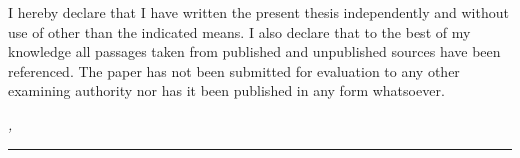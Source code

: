 %
\label{sec:declaration}
\thispagestyle{empty}

I hereby declare that I have written the present thesis independently and without use of other than the indicated means. I also declare that to the best of my knowledge all passages taken from published and unpublished sources have been referenced. The paper has not been submitted for evaluation to any other examining authority nor has it been published in any form whatsoever.

\bigskip

\noindent\textit{\thesisUniversityCity, \thesisDate}

\smallskip

\begin{flushright}
	\begin{minipage}{5cm}
		\rule{\textwidth}{1pt}
		\centering\thesisName
	\end{minipage}
\end{flushright}

